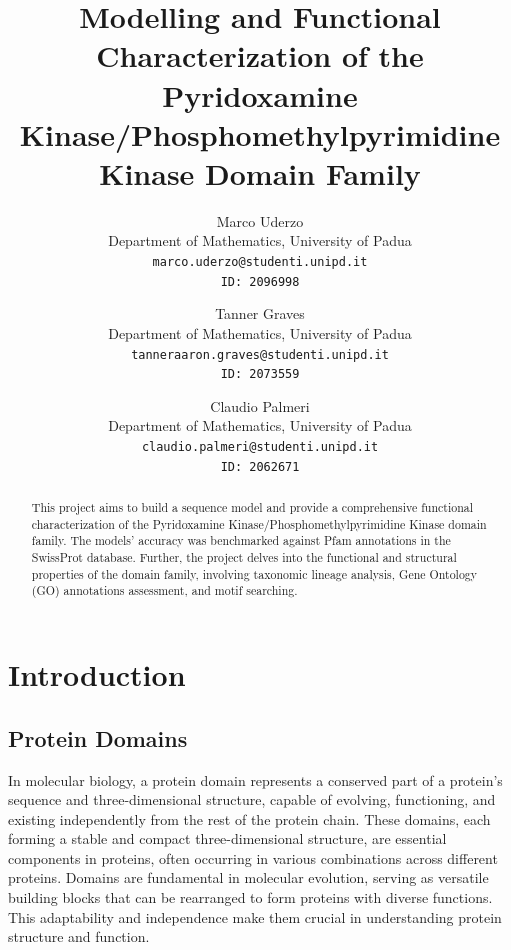 \documentclass[10pt,twocolumn,letterpaper]{article}
\begin{document}

\title{Modelling and Functional Characterization of the Pyridoxamine Kinase/Phosphomethylpyrimidine Kinase Domain Family}

\author{
Marco Uderzo\\
{\small Department of Mathematics, University of Padua}\\
{\tt\small marco.uderzo@studenti.unipd.it}\\
{\tt\small ID: 2096998} \\
\and
Tanner Graves\\
{\small Department of Mathematics, University of Padua}\\
{\tt\small tanneraaron.graves@studenti.unipd.it}\\
{\tt\small ID: 2073559} \\
\and
Claudio Palmeri \\
{\small Department of Mathematics, University of Padua}\\
{\tt\small claudio.palmeri@studenti.unipd.it}\\
{\tt\small ID: 2062671} \\
}


\maketitle


\begin{abstract}
    This project aims to build a sequence model and provide a comprehensive functional characterization of the Pyridoxamine Kinase/Phosphomethylpyrimidine Kinase domain family.
    The models' accuracy was benchmarked against Pfam annotations in the SwissProt database. Further, the project delves into the functional and structural properties of the domain family, involving taxonomic lineage analysis, Gene Ontology (GO) annotations assessment, and motif searching.
\end{abstract}

\section{Introduction}

\subsection{Protein Domains}

In molecular biology, a protein domain represents a conserved part of a protein's sequence and three-dimensional structure, capable of evolving, functioning, and existing independently from the rest of the protein chain. These domains, each forming a stable and compact three-dimensional structure, are essential components in proteins, often occurring in various combinations across different proteins. Domains are fundamental in molecular evolution, serving as versatile building blocks that can be rearranged to form proteins with diverse functions. This adaptability and independence make them crucial in understanding protein structure and function.
\end{document}
